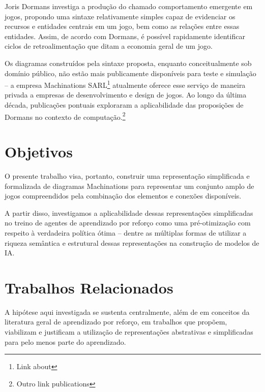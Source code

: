 \documentclass[conference]{IEEEtran}
\begin{document}
Joris Dormans\cite{machinations} investiga a produção do chamado comportamento emergente em jogos, propondo uma sintaxe relativamente simples capaz de evidenciar os recursos e entidades centrais em um jogo, bem como as relações entre essas entidades. Assim, de acordo com Dormans, é possível rapidamente identificar ciclos de retroalimentação que ditam a economia geral de um jogo.

Os diagramas construídos pela sintaxe proposta, enquanto conceitualmente sob domínio público, não estão mais publicamente disponíveis para teste e simulação -- a empresa Machinations SARL\footnote{Link about} atualmente oferece esse serviço de maneira privada a empresas de desenvolvimento e design de jogos. Ao longo da última década, publicações pontuais exploraram a aplicabilidade das proposições de Dormans no contexto de computação.\footnote{Outro link publications}


\section{Objetivos}
\label{goals}

O presente trabalho visa, portanto, construir uma representação simplificada e formalizada de diagramas  Machinations para representar um conjunto amplo de jogos compreendidos pela combinação dos elementos e conexões disponíveis. 

A partir disso, investigamos a aplicabilidade dessas representações simplificadas no treino de agentes de aprendizado por reforço como uma pré-otimização com respeito à verdadeira política ótima -- dentre as múltiplas formas de utilizar a riqueza semântica e estrutural dessas representações na construção de modelos de IA.

\section{Trabalhos Relacionados}
A hipótese aqui investigada se sustenta centralmente, além de em conceitos da literatura geral de aprendizado por reforço, em trabalhos que propõem, viabilizam e justificam a utilização de representações abstrativas e simplificadas para pelo menos parte do aprendizado.
\end{document}
